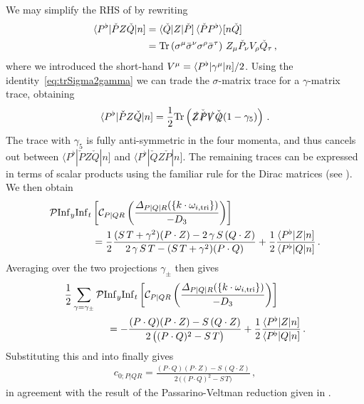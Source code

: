 We may simplify the RHS of  by rewriting
\begin{align} 
\langle P^{\flat}|\check{P} Z \check{Q}|n] & = \langle \check{Q} | Z | \check{P} ] \, \langle \check{P} P^{\flat} \rangle [n\check{Q}] \nonumber \\
& = \mathrm{Tr}\left(\sigma^{\mu} \bar{\sigma}^{\nu} \sigma^{\rho} \bar{\sigma}^{\tau} \right) \, Z_{\mu} \check{P}_{\nu} V_{\rho} \check{Q}_{\tau} \,,
\end{align}
where we introduced the short-hand
$ V^{\mu} = \langle P^{\flat} | \gamma^{\mu} | n ]/2$. Using the identity~\eqref{eq:trSigma2gamma} we can trade the $\sigma$-matrix trace for a $\gamma$-matrix trace, obtaining
\begin{align}
\langle P^{\flat}|\check{P} Z \check{Q}|n] = \frac{1}{2} \text{Tr}\left( \slashed{Z} \check{\slashed{P}} \slashed{V} \check{\slashed{Q}} (1-\gamma_5) \right) \,.
\end{align}
The trace with $\gamma_5$ is fully anti-symmetric in the four momenta, and thus cancels out between $\langle P^{\flat}|\check{P} Z \check{Q}|n]$ and $\langle P^{\flat}|\check{Q} Z \check{P}|n]$. The remaining traces can be expressed in terms of scalar products using the familiar rule for the Dirac matrices (see ). We then obtain
\begin{align}
\begin{aligned}
 & \mathcal{P} \mathrm{Inf}_y \mathrm{Inf}_t \left[ \mathcal{C}_{P|QR}\left( \frac{\Delta_{P|Q|R}( \{k\cdot\omega_{i,{\rm tri}}\} )}{-D_3} \right) \right]  \\
 & \hspace{1.5cm} =  
 \frac{1}{2} \frac{(S \, T + \gamma^2) (P\cdot Z) - 2 \, \gamma \, S \, (Q\cdot Z)}{2 \, \gamma \, S \, T -  (S\, T +\gamma^2) (P\cdot Q)} +
 \frac{1}{2} \frac{\spAB{P^\flat}{Z}{n}}{\spAB{P^\flat}{Q}{n}}  \,.
 \end{aligned}
\end{align}
Averaging over the two projections $\gamma_{\pm}$ then gives
\begin{align}
\begin{aligned}
 & \frac{1}{2} \sum_{\gamma=\gamma_\pm} \mathcal{P} {\rm Inf}_y {\rm Inf}_t  \left[ \mathcal{C}_{P|QR}\left( \frac{\Delta_{P|Q|R}(\{k\cdot\omega_{i,{\rm tri}}\})}{-D_3} \right) \right] \\
 &  \hspace{1.5cm} = - \frac{(P\cdot Q) (P\cdot Z) - S \, (Q\cdot Z)}{2 \, \bigl( (P\cdot Q)^2 - S\,T \bigr)} + \frac{1}{2} \frac{\spAB{P^\flat}{Z}{n}}{\spAB{P^\flat}{Q}{n}} \,.
\end{aligned}
\end{align}
Substituting this and  into  finally gives
\begin{align}
c_{0;P|QR} =  \frac{(P\cdot Q) (P\cdot Z) - S \, (Q\cdot Z)}{2 \, \bigl( (P\cdot Q)^2 - S\,T \bigr)}  \,,
\end{align}
in agreement with the result of the Passarino-Veltman reduction given in .

